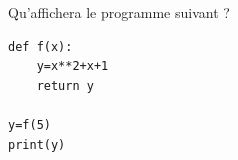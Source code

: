 \begin{exo}{}
	Qu'affichera le programme suivant ?

	\begin{lstlisting}
def f(x):
    y=x**2+x+1
    return y

y=f(5)
print(y)
\end{lstlisting}
\end{exo}
